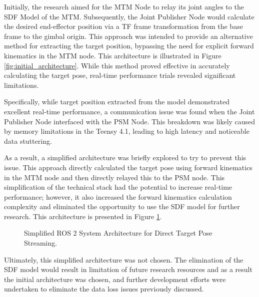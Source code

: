 Initially, the research aimed for the MTM Node to relay its joint angles to the SDF Model of the MTM. Subsequently, the Joint Publisher Node would calculate the desired end-effector position via a TF frame transformation from the base frame to the gimbal origin. This approach was intended to provide an alternative method for extracting the target position, bypassing the need for explicit forward kinematics in the MTM node. This architecture is illustrated in Figure \ref{fig:initial_architecture}. While this method proved effective in accurately calculating the target pose, real-time performance trials revealed significant limitations.

Specifically, while target position extracted from the model demonstrated excellent real-time performance, a communication issue was found when the Joint Publisher Node interfaced with the PSM Node. This breakdown was likely caused by memory limitations in the Teensy 4.1, leading to high latency and noticeable data stuttering.

As a result, a simplified architecture was briefly explored to try to prevent this issue. This approach directly calculated the target pose using forward kinematics in the MTM node and then directly relayed this to the PSM node. This simplification of the technical stack had the potential to increase real-time performance; however, it also increased the forward kinematics calculation complexity and eliminated the opportunity to use the SDF model for further research. This architecture is presented in Figure \ref{fig:optimized_architecture}.

\begin{figure}[h!]
    \centering
    \caption{Simplified ROS 2 System Architecture for Direct Target Pose Streaming.}
    \label{fig:optimized_architecture}
\end{figure}

Ultimately, this simplified architecture was not chosen. The elimination of the SDF model would result in limitation of future research resources and as a result the initial architecture was chosen, and further development efforts were undertaken to eliminate the data loss issues previously discussed.

